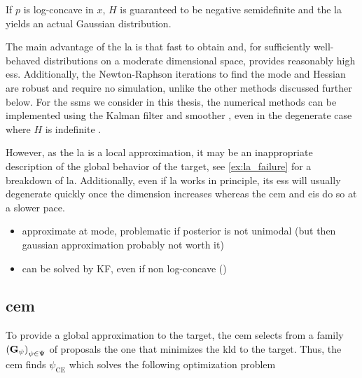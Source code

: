 If $p$ is log-concave in $x$, $H$ is guaranteed to be negative semidefinite and the \gls{la} yields an actual Gaussian distribution. 


The main advantage of the \gls{la} is that fast to obtain and, for sufficiently well-behaved distributions on a moderate dimensional space, provides reasonably high \gls{ess}. Additionally, the Newton-Raphson iterations to find the mode and Hessian are robust and require no simulation, unlike the other methods discussed further below.
For the \glspl{ssm} we consider in this thesis, the numerical methods can be implemented using the Kalman filter and smoother \cite{Shephard1997Likelihood,Durbin1997Monte}, even in the degenerate case where $H$ is indefinite \cite{Jungbacker2007Monte}.

However, as the \gls{la} is a local approximation, it may be an inappropriate description of the global behavior of the target, see \cref{ex:la_failure} for a breakdown of \gls{la}. 
Additionally, even if \gls{la} works in principle, its \gls{ess} will usually degenerate quickly once the dimension increases whereas the \gls{cem} and \gls{eis} do so at a slower pace.

\begin{itemize}
    \item approximate at mode, problematic if posterior is not unimodal (but then gaussian approximation probably not worth it)
    \item can be solved by KF, even if non log-concave ()
\end{itemize}

\subsection{\gls{cem}}
To provide a global approximation to the target, the \gls{cem}\cite{Rubinstein1999CrossEntropy,Rubinstein2004CrossEntropy} selects from a family $ \left( \mathbf G_{\psi} \right)_{\psi \in \Psi}$ of proposals the one that minimizes the \gls{kld} to the target. Thus, the \gls{cem} finds $\psi_{\text{CE}}$ which solves the following optimization problem

